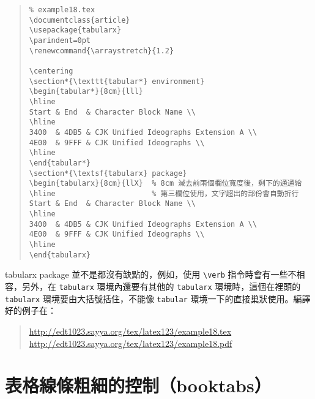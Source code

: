 \begin{quote}
  \begin{verbatim}
% example18.tex
\documentclass{article}
\usepackage{tabularx}
\parindent=0pt
\renewcommand{\arraystretch}{1.2}

\centering
\section*{\texttt{tabular*} environment}
\begin{tabular*}{8cm}{lll}
\hline
Start & End  & Character Block Name \\
\hline
3400  & 4DB5 & CJK Unified Ideographs Extension A \\
4E00  & 9FFF & CJK Unified Ideographs \\
\hline
\end{tabular*}
\section*{\textsf{tabularx} package}
\begin{tabularx}{8cm}{llX}  % 8cm 減去前兩個欄位寬度後，剩下的通通給
\hline                      % 第三欄位使用，文字超出的部份會自動折行
Start & End  & Character Block Name \\
\hline
3400  & 4DB5 & CJK Unified Ideographs Extension A \\
4E00  & 9FFF & CJK Unified Ideographs \\
\hline
\end{tabularx}

\end{verbatim}
\end{quote}

\textsf{tabularx} package 並不是都沒有缺點的，例如，使用 \verb|\verb| 指令時會有一些不相容，另外，在 \texttt{tabularx} 環境內還要有其他的 \texttt{tabularx} 環境時，這個在裡頭的 \texttt{tabularx} 環境要由大括號括住，不能像 \texttt{tabular} 環境一下的直接巢狀使用。編譯好的例子在：

\begin{quote}
  \url{http://edt1023.sayya.org/tex/latex123/example18.tex}\\
  \url{http://edt1023.sayya.org/tex/latex123/example18.pdf}
\end{quote}


\section{表格線條粗細的控制（booktabs）}
\label{sec:booktabs}

